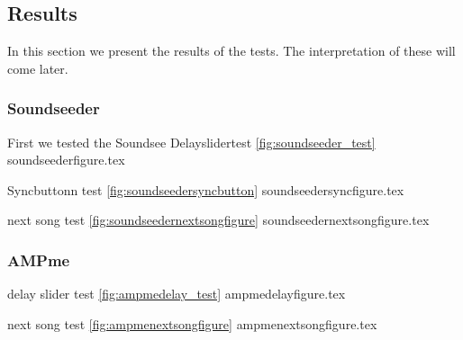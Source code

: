 \subsection{Results}
In this section we present the results of the tests.
The interpretation of these will come later.
\subsubsection{Soundseeder}
First we tested the Soundsee
Delayslidertest \vref{fig:soundseeder_test}
{soundseederfigure.tex}

Syncbuttonn test \vref{fig:soundseedersyncbutton}
{soundseedersyncfigure.tex}

next song test \vref{fig:soundseedernextsongfigure}
{soundseedernextsongfigure.tex}

\subsubsection{AMPme}
delay slider test \vref{fig:ampmedelay_test}
{ampmedelayfigure.tex}

next song test \vref{fig:ampmenextsongfigure}
{ampmenextsongfigure.tex}

